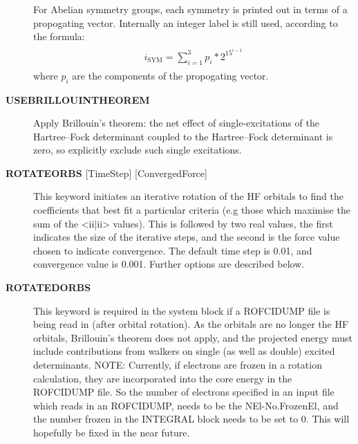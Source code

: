 \documentclass[openany,a4paper,10pt]{manual}
\begin{document}
\begin{description}
For Abelian symmetry groups, each symmetry is printed out in terms of
a propogating vector.  Internally an integer label is still used, according to
the formula:
\begin{align}\begin{split}i_{\textrm{SYM}} = \sum_{i=1}^3 p_i * 2^{15^{i-1}}\end{split}\end{align}
where $p_i$ are the components of the propogating vector.

\item[\textbf{USEBRILLOUINTHEOREM}]
Apply Brillouin's theorem: the net effect of single-excitations of
the Hartree--Fock determinant coupled to the Hartree--Fock determinant
is zero, so explicitly exclude such single excitations.

\item[\textbf{ROTATEORBS} {[}TimeStep{]} {[}ConvergedForce{]}]
This keyword initiates an iterative rotation of the HF orbitals to find the
coefficients that best fit a particular criteria (e.g those which maximise
the sum of the \textless{}ii|ii\textgreater{} values).
This is followed by two real values, the first indicates the size of the
iterative steps, and the second is the force value chosen to indicate convergence.
The default time step is 0.01, and convergence value is 0.001.
Further options are described below.

\item[\textbf{ROTATEDORBS}]
This keyword is required in the system block if a ROFCIDUMP file is being read in
(after orbital rotation).  As the orbitals are no longer the HF orbitals, Brillouin's
theorem does not apply, and the projected energy must include contributions from
walkers on single (as well as double) excited determinants.
NOTE: Currently, if electrons are frozen in a rotation calculation, they are
incorporated into the core energy in the ROFCIDUMP file.  So the number of electrons
specified in an input file which reads in an ROFCIDUMP, needs to be the NEl-No.FrozenEl,
and the number frozen in the INTEGRAL block needs to be set to 0.
This will hopefully be fixed in the near future.

\end{description}
\end{document}
